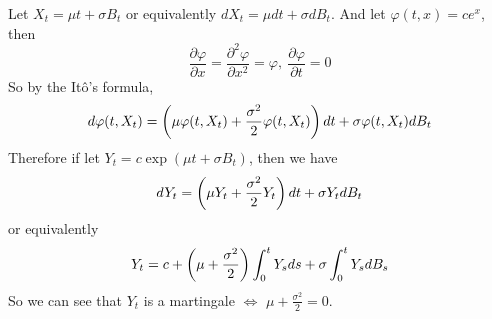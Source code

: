 \documentclass[a4paper,12pt]{article}
\begin{document}
\begin{itemize}
\begin{rmk}
  \end{rmk}
  \begin{exam}
    Let $X_t = \mu t + \sigma B_t$ or equivalently $dX_t = \mu dt + \sigma dB_t$. And let $\varphi(t, x) = ce^x$, then
    \begin{equation*}
      \frac{\partial \varphi}{\partial x} = \frac{\partial^2 \varphi}{\partial x^2} = \varphi,~\frac{\partial \varphi}{\partial t} = 0
    \end{equation*}
    So by the It\^o's formula,
    \begin{equation*}
      d\varphi(t, X_t) = \left(\mu \varphi(t, X_t) + \frac{\sigma^2}{2} \varphi(t, X_t)\right)dt + \sigma \varphi(t, X_t) dB_t
    \end{equation*}
    Therefore if let $Y_t = c\exp(\mu t + \sigma B_t)$, then we have
    \begin{equation*}
      dY_t = \left(\mu Y_t + \frac{\sigma^2}{2}Y_t\right)dt + \sigma Y_t dB_t
    \end{equation*}
    or equivalently
    \begin{equation*}
      Y_t = c + \left(\mu+\frac{\sigma^2}{2}\right)\int_0^tY_sds + \sigma\int_0^tY_s dB_s
    \end{equation*}
    So we can see that $Y_t$ is a martingale $\Leftrightarrow$ $\mu + \frac{\sigma^2}{2} = 0$.
  \end{exam}


\end{itemize}
\end{document}
